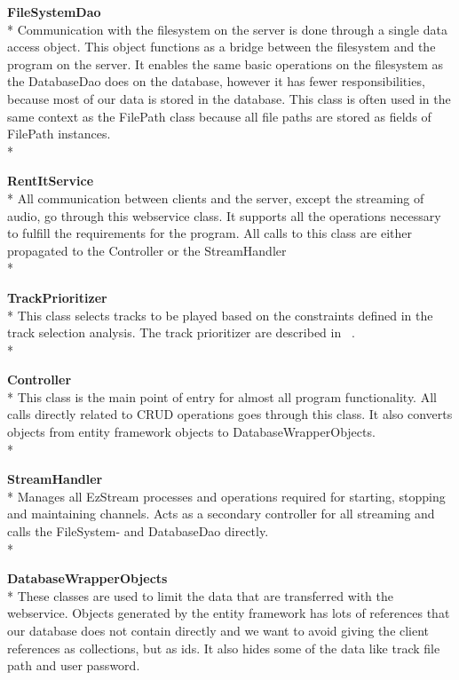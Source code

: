 \documentclass[a4paper,11pt,report]{article}
\begin{document}
{\textbf{FileSystemDao} \\*
Communication with the filesystem on the server is done through a single data access object. This object functions as a bridge between the filesystem and the program on the server. It enables the same basic operations on the filesystem as the DatabaseDao does on the database, however it has fewer responsibilities, because most of our data is stored in the database. This class is often used in the same context as the FilePath class because all file paths are stored as fields of FilePath instances. \\*

\textbf{RentItService} \\*
All communication between clients and the server, except the streaming of audio, go through this webservice class. It supports all the operations necessary to fulfill the requirements for the program. All calls to this class are either propagated to the Controller or the StreamHandler \\*

\textbf{TrackPrioritizer} \\*
This class selects tracks to be played based on the constraints defined in the track selection analysis. The track prioritizer are described in ~. \\*

\textbf{Controller} \\*
This class is the main point of entry for almost all program functionality. All calls directly related to CRUD operations goes through this class. It also converts objects from entity framework objects to DatabaseWrapperObjects.\\*

\textbf{StreamHandler} \\*
Manages all EzStream processes and operations required for starting, stopping and maintaining channels. Acts as a secondary controller for all streaming and calls the FileSystem- and DatabaseDao directly. \\*

\textbf{DatabaseWrapperObjects} \\*
These classes are used to limit the data that are transferred with the webservice. Objects generated by the entity framework has lots of references that our database does not contain directly and we want to avoid giving the client references as collections, but as ids. It also hides some of the data like track file path and user password.

}
\end{document}
